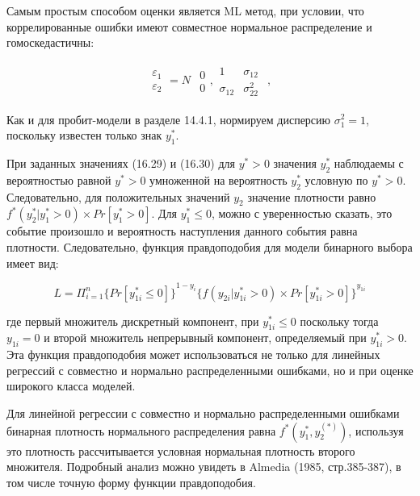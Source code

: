 Самым простым способом оценки является ML метод, при условии, что коррелированные ошибки имеют совместное нормальное распределение и гомоскедастичны:

\[
\begin{matrix}
\varepsilon_1\\ \varepsilon_2
\end{matrix}
=
N
\begin{matrix}
\begin{matrix}
0 \\ 0
\end{matrix},
\begin{matrix}
1 &\sigma_{12} \\ \sigma_{12}&\sigma_{22}^2
\end{matrix}
\end{matrix},
\]

Как и для пробит-модели в разделе 14.4.1, нормируем дисперсию $\sigma^{2}_1=1$, поскольку известен только знак $y^{*}_1$. 

При заданных значениях (16.29) и (16.30) для $y^{*}>0$ значения $y^{*}_2$ наблюдаемы с вероятностью равной $y^{*}>0$ умноженной на вероятность $y^{*}_2$ условную по $y^{*}>0$. Следовательно, для положительных значений $y_2$ значение плотности равно $f^{*}(y^{*}_2|y^{*}_1>0){\times}Pr[y^{*}_1>0]$. Для $y^{*}_{1}{\leq}0$, можно с уверенностью сказать, это событие произошло и вероятность наступления данного события равна плотности. Следовательно, функция правдоподобия для модели бинарного выбора имеет вид:

\begin{equation}
L=\Pi_{i=1}^n{\lbrace Pr[y_{1i}^{*}{\leq}0]\rbrace}^{1-y_i}{\lbrace f(y_{2i}|y_{1i}^{*}>0){\times}Pr[y_{1i}^{*}>0]\rbrace}^{y_{1i}}
\end{equation}

где первый множитель дискретный компонент, при $y^{*}_{1i}{\leq}0$ поскольку тогда $y_{1i}=0$ и второй множитель непрерывный компонент, определяемый при $y^{*}_{1i}>0$. Эта функция правдоподобия может использоваться не только для линейных регрессий с совместно и нормально распределенными ошибками, но и при оценке широкого класса моделей.

Для линейной регрессии с совместно и нормально распределенными ошибками бинарная плотность нормального распределения равна $f^{*}(y^{*}_1,y^(*)_2)$, используя это плотность рассчитывается условная нормальная плотность второго множителя. Подробный анализ можно увидеть в Almedia (1985, стр.385-387), в том числе точную форму функции правдоподобия. 

